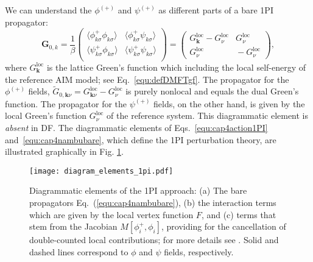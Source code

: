 \documentclass[rmp,aps,reprint,amsmath,amssymb,superscriptaddress,showpacs,nofootinbib]{revtex4-1}
\begin{document}
We can understand the $\phi^{(+)}$ and $\psi^{(+)}$ as different parts of a bare 1PI propagator:
\begin{equation}
 \label{equ:cap4nambubare}
\mathbf{G}_{0,k}=\frac{1}{\beta} 
\left(\!\!\begin{array}{cc}
\langle \phi^+_{k \sigma}\phi^{\phantom{+}}_{k \sigma} \rangle\! &\!\langle  \phi^+_{k \sigma}\psi^{\phantom{+}}_{k \sigma}\rangle \\
\!\langle \psi^+_{k \sigma}\phi^{\phantom{+}}_{k \sigma} \rangle\! &\!\langle  \psi^+_{k \sigma}\psi^{\phantom{+}}_{k \sigma}\rangle \\
\end{array}
\!\!\right)
=\left(\!\!
\begin{array}{cc}
G^{\text{loc}}_{\mathbf{k}}\!-G^{\text{loc}}_\nu \! &\!\! G^{\text{loc}}_\nu \\
G^{\text{loc}}_\nu\! &\!\! -G^{\text{loc}}_\nu
\end{array}
\!\!\!\right)\!,
\end{equation}
where $G^{\text{loc}}_{\mathbf{k}}$ is the lattice Green's function which including the local self-energy of the reference AIM model; see Eq.~\eqref{equ:defDMFTgf}. The propagator for the $\phi^{(+)}$ fields, $\widetilde{G}_{0,\mathbf{k}\nu}=G^{\text{loc}}_{\mathbf{k}\nu}\!-G^{\text{loc}}_\nu$ is purely nonlocal and equals the dual Green's function. The propagator for the $\psi^{(+)}$ fields, on the other hand, is given by the local Green's function $G^{\text{loc}}_\nu$ of the reference system. This diagrammatic element is {\sl absent} in DF. The diagrammatic elements of Eqs.~\eqref{equ:cap4action1PI} and~\eqref{equ:cap4nambubare}, which define the 1PI perturbation theory, are illustrated graphically in Fig. \ref{fig:diagramelements1pI}.

\begin{figure}
  \texttt{[image: diagram\_elements\_1pi.pdf]}
    \caption{Diagrammatic elements of the 1PI approach: (a) The bare propagators Eq.~(\ref{equ:cap4nambubare}), (b) the interaction terms which are given by the local vertex function $F$, and (c) terms that stem from the Jacobian $M[\phi^+_i,\phi_i]$, providing for the cancellation of double-counted local contributions; for more details see \cite{Rohringer2013a}. Solid and dashed lines correspond to $\phi$ and $\psi$ fields, respectively.}
  \label{fig:diagramelements1pI}
\end{figure}
\end{document}

